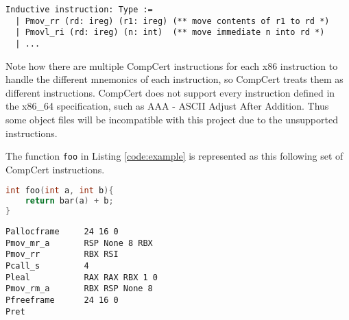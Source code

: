 \begin{lstlisting}[language=Coq]
Inductive instruction: Type :=
  | Pmov_rr (rd: ireg) (r1: ireg) (** move contents of r1 to rd *)
  | Pmovl_ri (rd: ireg) (n: int)  (** move immediate n into rd *)
  | ...
\end{lstlisting}

Note how there are multiple CompCert instructions for each x86 instruction to handle the different mnemonics of each instruction, so CompCert treats them as different instructions. CompCert does not support every instruction defined in the x86\_64 specification, such as AAA - ASCII Adjust After Addition. Thus some object files will be incompatible with this project due to the unsupported instructions.

The function \lstinline{foo} in Listing \ref{code:example} is represented as this following set of CompCert instructions.

\begin{lstlisting}[language=C, caption=\lstinline{foo} from example]
int foo(int a, int b){
    return bar(a) + b;
}
\end{lstlisting}

\begin{lstlisting}[caption=CompCert instructions for \lstinline{foo}, label=code:instructions]
Pallocframe     24 16 0
Pmov_mr_a       RSP None 8 RBX
Pmov_rr         RBX RSI
Pcall_s         4
Pleal           RAX RAX RBX 1 0
Pmov_rm_a       RBX RSP None 8
Pfreeframe      24 16 0
Pret 
\end{lstlisting}


